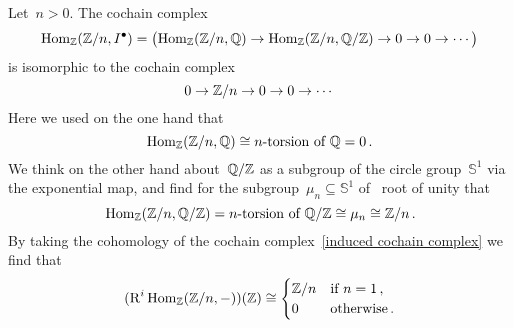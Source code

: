 Let~$n > 0$.
The cochain complex
\[
  \operatorname{Hom}_{\mathbb{Z}}(\mathbb{Z}/n, I^\bullet)
  =
  \bigl(
  \operatorname{Hom}_{\mathbb{Z}}(\mathbb{Z}/n, \mathbb{Q})
  \to
  \operatorname{Hom}_{\mathbb{Z}}(\mathbb{Z}/n, \mathbb{Q}/\mathbb{Z})
  \to
  0
  \to
  0
  \to
  \dotsb
  \bigr)
\]
is isomorphic to the cochain complex
\begin{equation}
  \label{induced cochain complex}
  0
  \to
  \mathbb{Z}/n
  \to
  0
  \to
  0
  \to
  \dotsb
\end{equation}
Here we used on the one hand that
\[
  \Hom_\Integer(\Integer/n, \Rational)
  \cong
  \text{\dash{$n$}{torsion} of~$\Rational$}
  =
  0 \,.
\]
We think on the other hand about~$\mathbb{Q}/\mathbb{Z}$ as a subgroup of the circle group~$\mathbb{S}^1$ via the exponential map, and find for the subgroup~$\mu_n \subseteq \mathbb{S}^1$ of~ root of unity that
\begin{equation}
  \label{determining torsion of QZ}
  \Hom_\Integer(\Integer/n, \Rational/\Integer)
  =
  \text{\dash{$n$}{torsion} of~$\Rational/\Integer$}
  \cong
  \mu_n
  \cong
  \Integer/n \,.
\end{equation}
By taking the cohomology of the cochain complex~\eqref{induced cochain complex} we find that
\[
  ( \operatorname{R}^i \operatorname{Hom}_{\mathbb{Z}}(\mathbb{Z}/n, -) )(\mathbb{Z})
  \cong
  \begin{cases}
    \mathbb{Z}/n  & \text{if~$n = 1$} \,, \\
    0           & \text{otherwise}  \,.
  \end{cases}
\]




